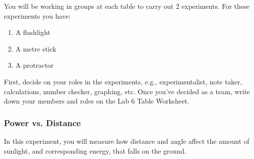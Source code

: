 \documentclass[main.tex]{subfiles}
\begin{document}
You will be working in groups at each table to carry out 2 experiments. For these experiments you have:
\begin{enumerate}
\item A flashlight
\item A metre stick
\item A protractor
\end{enumerate}

First, decide on your roles in the experiments, e.g., experimentalist, note taker, calculations, number checker, graphing, etc. Once you've decided as a team, write down your members and roles on the Lab 6 Table Worksheet.

\subsubsection{Power vs. Distance}
In this experiment, you will measure how distance and angle affect the amount of sunlight, and corresponding energy, that falls on the ground.
\end{document}
